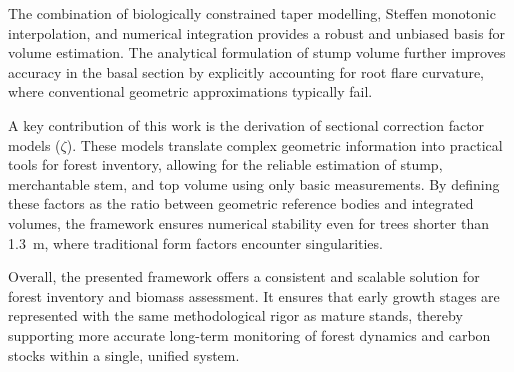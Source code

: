 \documentclass[twocolumn, bibliography=totoc]{scrartcl}
\begin{document}
The combination of biologically constrained taper modelling, Steffen monotonic interpolation, and numerical integration provides a robust and unbiased basis for volume estimation. The analytical formulation of stump volume further improves accuracy in the basal section by explicitly accounting for root flare curvature, where conventional geometric approximations typically fail.

A key contribution of this work is the derivation of sectional correction factor models ($\zeta$). These models translate complex geometric information into practical tools for forest inventory, allowing for the reliable estimation of stump, merchantable stem, and top volume using only basic measurements. By defining these factors as the ratio between geometric reference bodies and integrated volumes, the framework ensures numerical stability even for trees shorter than \qty{1.3}{m}, where traditional form factors encounter singularities.

Overall, the presented framework offers a consistent and scalable solution for forest inventory and biomass assessment. It ensures that early growth stages are represented with the same methodological rigor as mature stands, thereby supporting more accurate long-term monitoring of forest dynamics and carbon stocks within a single, unified system.


\printbibliography

\end{document}
